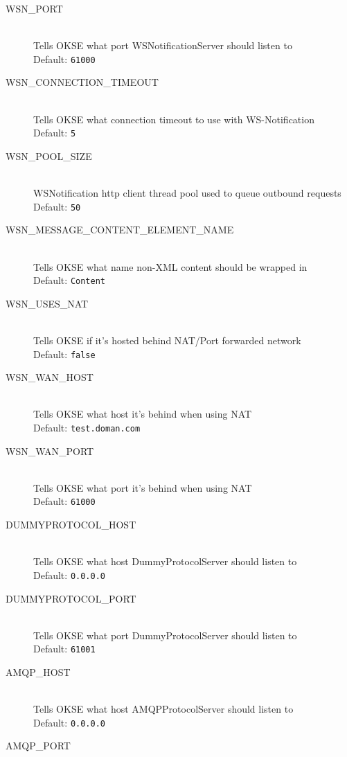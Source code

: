\begin{description}
  \item[WSN\_PORT] \hfill \\
  Tells OKSE what port WSNotificationServer should listen to \hfill \\ Default: \verb!61000!
  \item[WSN\_CONNECTION\_TIMEOUT] \hfill \\
  Tells OKSE what connection timeout to use with WS-Notification \hfill \\ Default: \verb!5!
  \item[WSN\_POOL\_SIZE] \hfill \\
   WSNotification http client thread pool used to queue outbound requests \hfill \\ Default: \verb!50!
   \item[WSN\_MESSAGE\_CONTENT\_ELEMENT\_NAME] \hfill \\
  Tells OKSE what name non-XML content should be wrapped in \hfill \\ Default: \verb!Content!
  \item[WSN\_USES\_NAT] \hfill \\
  Tells OKSE if it's hosted behind NAT/Port forwarded network \hfill \\ Default: \verb!false!
  \item[WSN\_WAN\_HOST] \hfill \\
  Tells OKSE what host it's behind when using NAT \hfill \\ Default: \verb!test.doman.com!
  \item[WSN\_WAN\_PORT] \hfill \\
  Tells OKSE what port it's behind when using NAT \hfill \\ Default: \verb!61000!
  \item[DUMMYPROTOCOL\_HOST] \hfill \\
  Tells OKSE what host DummyProtocolServer should listen to \hfill \\ Default: \verb!0.0.0.0!
  \item[DUMMYPROTOCOL\_PORT] \hfill \\
  Tells OKSE what port DummyProtocolServer should listen to \hfill \\ Default: \verb!61001!
  \item[AMQP\_HOST] \hfill \\
  Tells OKSE what host AMQPProtocolServer should listen to \hfill \\ Default: \verb!0.0.0.0!
  \item[AMQP\_PORT] \hfill \\

\end{description}
